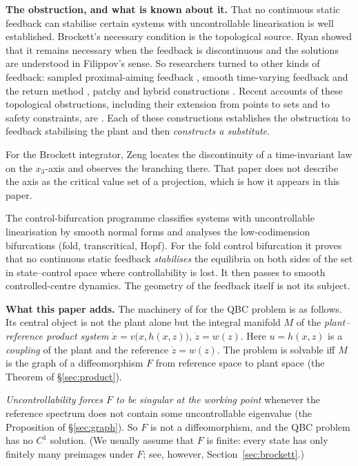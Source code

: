 \documentclass[11pt,reqno]{amsart}
\theoremstyle{plain}
\theoremstyle{definition}
\theoremstyle{remark}
\begin{document}
\medskip
\noindent\textbf{The obstruction, and what is known about it.}
That no continuous static feedback can stabilise certain systems with uncontrollable
linearisation is well established. Brockett's necessary condition \cite{Brockett1983}
is the topological source. Ryan \cite{Ryan1994} showed that it remains necessary when
the feedback is discontinuous and the solutions are understood in Filippov's sense. So researchers turned to other kinds of
feedback: sampled proximal-aiming feedback
\cite{CLSS1997}, smooth time-varying feedback and the return method
\cite{Coron2007}, patchy and hybrid constructions \cite{GoebelSanfeliceTeel2012}. Recent accounts of these
topological obstructions, including their extension from points to sets and to safety constraints, are
\cite{KvalheimKoditschek2022,JongeneelMoulay2023}. Each of these constructions establishes the
obstruction to feedback stabilising the plant and then \emph{constructs a substitute}.

For the Brockett integrator, Zeng \cite{Zeng2022} locates the
discontinuity of a time-invariant law on the $x_3$-axis and observes the branching there. That paper does not describe the
axis as the critical value set of a projection, which is how it appears in this paper.

The control-bifurcation programme
\cite{KrenerKangChang2004,Kang1998} classifies systems with uncontrollable
linearisation by smooth normal forms and analyses the low-codimension
bifurcations (fold, transcritical, Hopf). For the fold control
bifurcation it proves that no continuous static feedback \emph{stabilises} the equilibria on both
sides of the set in state--control space where controllability is lost. It then passes
to smooth controlled-centre dynamics. The geometry of the feedback itself is not its subject.

\medskip
\noindent\textbf{What this paper adds.}
The machinery of \cite{Shosh1990} for the QBC problem is as follows. Its central object is not the plant alone but the integral
manifold $M$ of the \emph{plant--reference product system} $\dot x=v\bigl(x,h(x,z)\bigr)$, $\dot z=w(z)$. Here
$u=h(x,z)$ is a \emph{coupling} of the plant and the reference $\dot z=w(z)$. The problem
is solvable iff $M$ is the graph of a diffeomorphism $F$ from reference space to
plant space (the Theorem of \S\ref{sec:product}).

\emph{Uncontrollability forces $F$ to be singular at the
working point} whenever the reference spectrum does not contain some uncontrollable eigenvalue (the Proposition of
\S\ref{sec:graph}). So $F$ is not a diffeomorphism, and the QBC problem has no $C^1$ solution. (We usually assume that $F$ is finite: every state has only finitely
many preimages under $F$; see, however, Section~\ref{sec:brockett}.)
\end{document}
